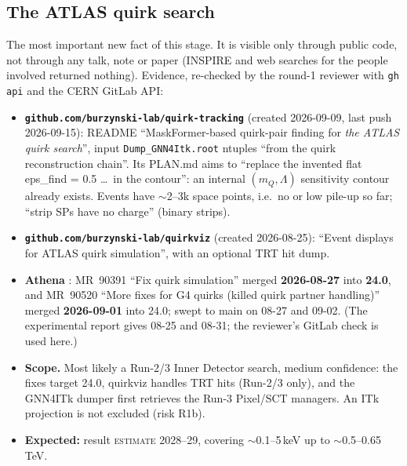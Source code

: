 \documentclass[11pt,a4paper]{article}
\newcommand{\EST}{\textsc{estimate}}
\DeclareRobustCommand{\file}[1]{\path{#1}}
\newcommand{\mQ}{m_Q}
\begin{document}
\subsection{The ATLAS quirk search}
The most important new fact of this stage. It is visible only through public code, not through any talk, note or paper (INSPIRE and web searches for the people involved returned nothing). Evidence, re-checked by the round-1 reviewer with \texttt{gh api} and the CERN GitLab API:
\begin{itemize}
\item \textbf{\texttt{github.com/burzynski-lab/quirk-tracking}} (created 2026-09-09, last push 2026-09-15): README ``MaskFormer-based quirk-pair finding for \emph{the ATLAS quirk search}'', input \texttt{Dump\_GNN4Itk.root} ntuples ``from the quirk reconstruction chain''. Its PLAN.md aims to ``replace the invented flat eps\_find = 0.5 \ldots\ in the contour'': an internal $(\mQ,\Lambda)$ sensitivity contour already exists. Events have $\sim$2--3k space points, i.e.\ no or low pile-up so far; ``strip SPs have no charge'' (binary strips).
\item \textbf{\texttt{github.com/burzynski-lab/quirkviz}} (created 2026-08-25): ``Event displays for ATLAS quirk simulation'', with an optional TRT hit dump.
\item \textbf{Athena \file{Simulation/G4Extensions/Quirks}}: MR~90391 ``Fix quirk simulation'' merged \textbf{2026-08-27} into \textbf{24.0}, and MR~90520 ``More fixes for G4 quirks (killed quirk partner handling)'' merged \textbf{2026-09-01} into 24.0; swept to main on 08-27 and 09-02. (The experimental report gives 08-25 and 08-31; the reviewer's GitLab check is used here.)
\item \textbf{Scope.} Most likely a Run-2/3 Inner Detector search, medium confidence: the fixes target 24.0, quirkviz handles TRT hits (Run-2/3 only), and the GNN4ITk dumper first retrieves the Run-3 Pixel/SCT managers. An ITk projection is not excluded (risk R1b).
\item \textbf{Expected:} result \EST{} 2028--29, covering $\sim$0.1--5\,keV up to $\sim$0.5--0.65\,TeV.
\end{itemize}
\end{document}
